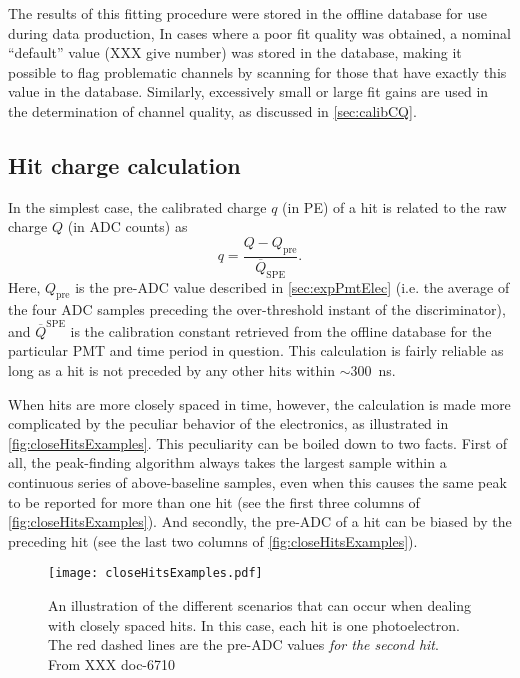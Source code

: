 \documentclass[../thesis.tex]{subfiles}
\begin{document}
The results of this fitting procedure were stored in the offline database for use during data production, In cases where a poor fit quality was obtained, a nominal ``default'' value (XXX give number) was stored in the database, making it possible to flag problematic channels by scanning for those that have exactly this value in the database. Similarly, excessively small or large fit gains are used in the determination of channel quality, as discussed in \autoref{sec:calibCQ}.

\subsection{Hit charge calculation}
\label{sec:calibHitCharge}

In the simplest case, the calibrated charge $q$ (in PE) of a hit is related to the raw charge $Q$ (in ADC counts) as
\begin{equation}
  \label{eq:corrChg}
  q = \frac{Q - Q_{\mathrm{pre}}}{\overline Q_{\mathrm{SPE}}}.
\end{equation}
Here, $Q_{\mathrm{pre}}$ is the pre-ADC value described in \autoref{sec:expPmtElec} (i.e. the average of the four ADC samples preceding the over-threshold instant of the discriminator), and $\overline Q^{\mathrm{SPE}}$ is the calibration constant retrieved from the offline database for the particular PMT and time period in question. This calculation is fairly reliable as long as a hit is not preceded by any other hits within $\sim$300~ns.

When hits are more closely spaced in time, however, the calculation is made more complicated by the peculiar behavior of the electronics, as illustrated in \autoref{fig:closeHitsExamples}. This peculiarity can be boiled down to two facts. First of all, the peak-finding algorithm always takes the largest sample within a continuous series of above-baseline samples, even when this causes the same peak to be reported for more than one hit (see the first three columns of \autoref{fig:closeHitsExamples}). And secondly, the pre-ADC of a hit can be biased by the preceding hit (see the last two columns of \autoref{fig:closeHitsExamples}). 

\begin{figure}[ht]
  \texttt{[image: closeHitsExamples.pdf]}
  \caption{An illustration of the different scenarios that can occur when dealing with closely spaced hits. In this case, each hit is one photoelectron. The red dashed lines are the pre-ADC values \emph{for the second hit}. From XXX doc-6710}
  \label{fig:closeHitsExamples}
\end{figure}
\end{document}
